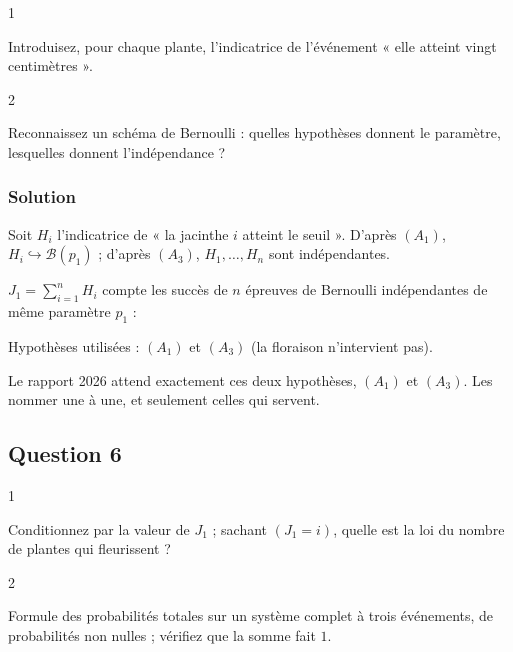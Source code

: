 \documentclass[11pt,a4paper]{article}
\newcommand{\equationajustee}[1]{%
  \sbox{\boiteequation}{$\displaystyle #1$}%
  \ifdim\wd\boiteequation>\linewidth
    \[\resizebox{\linewidth}{!}{\usebox{\boiteequation}}\]%
  \else
    \[#1\]%
  \fi}
\begin{document}
\begin{indication}{1}

Introduisez, pour chaque plante, l'indicatrice de l'événement « elle atteint vingt centimètres ».

\end{indication}

\begin{indication}{2}

Reconnaissez un schéma de Bernoulli : quelles hypothèses donnent le paramètre, lesquelles donnent l'indépendance ?

\end{indication}

\hypertarget{solution-10}{%
\subsubsection{Solution}\label{solution-10}}

Soit \(H_i\) l'indicatrice de « la jacinthe \(i\) atteint le seuil ». D'après \((A_1)\), \(H_i\hookrightarrow\mathcal B(p_1)\) ; d'après \((A_3)\), \(H_1,\dots,H_n\) sont indépendantes.

\(J_1=\sum_{i=1}^nH_i\) compte les succès de \(n\) épreuves de Bernoulli indépendantes de même paramètre \(p_1\) :

\equationajustee{\boxed{J_1\hookrightarrow\mathcal B(n,p_1)}}

Hypothèses utilisées : \((A_1)\) et \((A_3)\) (la floraison n'intervient pas).

\begin{jury}

Le rapport 2026 attend exactement ces deux hypothèses, \((A_1)\) et \((A_3)\). Les nommer une à une, et seulement celles qui servent.

\end{jury}

\hypertarget{question-6}{%
\subsection{Question 6}\label{question-6}}

\begin{indication}{1}

Conditionnez par la valeur de \(J_1\) ; sachant \((J_1=i)\), quelle est la loi du nombre de plantes qui fleurissent ?

\end{indication}

\begin{indication}{2}

Formule des probabilités totales sur un système complet à trois événements, de probabilités non nulles ; vérifiez que la somme fait \(1\).

\end{indication}
\end{document}
